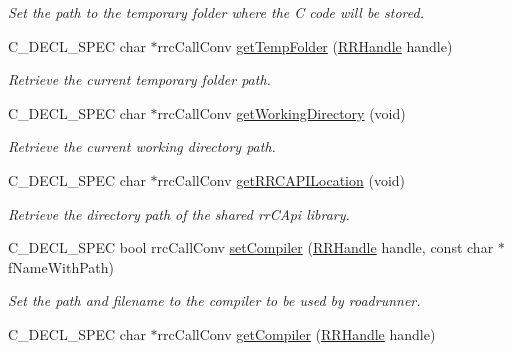 \begin{DoxyCompactItemize}
\begin{DoxyCompactList}\small\item\em Set the path to the temporary folder where the C code will be stored. \end{DoxyCompactList}\item 
C\-\_\-\-D\-E\-C\-L\-\_\-\-S\-P\-E\-C char $\ast$rrc\-Call\-Conv \hyperlink{group__utility_ga2aa2fbec7d08c77d38e62df4c48e428e}{get\-Temp\-Folder} (\hyperlink{rrc__types_8h_a1d68f0592372208fa5a5f2799ea4b3ae}{R\-R\-Handle} handle)
\begin{DoxyCompactList}\small\item\em Retrieve the current temporary folder path. \end{DoxyCompactList}\item 
C\-\_\-\-D\-E\-C\-L\-\_\-\-S\-P\-E\-C char $\ast$rrc\-Call\-Conv \hyperlink{group__utility_gad7dc449357c2b600b81c9e2990ad38dc}{get\-Working\-Directory} (void)
\begin{DoxyCompactList}\small\item\em Retrieve the current working directory path. \end{DoxyCompactList}\item 
C\-\_\-\-D\-E\-C\-L\-\_\-\-S\-P\-E\-C char $\ast$rrc\-Call\-Conv \hyperlink{group__utility_ga128bafde3b10f0ce64ca3c6b06b14cde}{get\-R\-R\-C\-A\-P\-I\-Location} (void)
\begin{DoxyCompactList}\small\item\em Retrieve the directory path of the shared rr\-C\-Api library. \end{DoxyCompactList}\item 
C\-\_\-\-D\-E\-C\-L\-\_\-\-S\-P\-E\-C bool rrc\-Call\-Conv \hyperlink{group__utility_ga452d753989b5142b29528ae5865224ae}{set\-Compiler} (\hyperlink{rrc__types_8h_a1d68f0592372208fa5a5f2799ea4b3ae}{R\-R\-Handle} handle, const char $\ast$f\-Name\-With\-Path)
\begin{DoxyCompactList}\small\item\em Set the path and filename to the compiler to be used by roadrunner. \end{DoxyCompactList}\item 
\hypertarget{group__utility_gae7a9642fcd8b299d57007bb45238fc82}{C\-\_\-\-D\-E\-C\-L\-\_\-\-S\-P\-E\-C char $\ast$rrc\-Call\-Conv \hyperlink{group__utility_gae7a9642fcd8b299d57007bb45238fc82}{get\-Compiler} (\hyperlink{rrc__types_8h_a1d68f0592372208fa5a5f2799ea4b3ae}{R\-R\-Handle} handle)}\label{group__utility_gae7a9642fcd8b299d57007bb45238fc82}


\end{DoxyCompactItemize}
